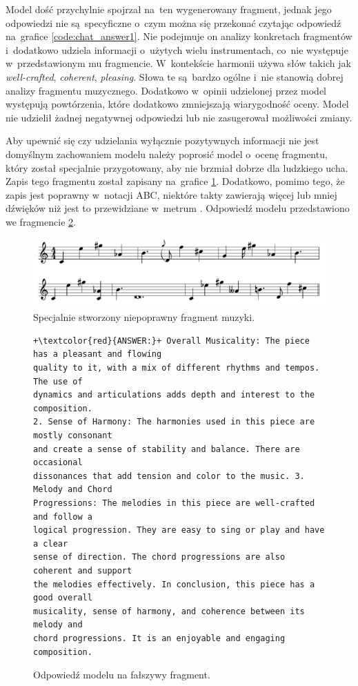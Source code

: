 \documentclass[data-science]{agh-wi} %
\begin{document}
Model dość przychylnie spojrzał na~ten wygenerowany fragment, jednak jego odpowiedzi nie są~specyficzne o~czym można się przekonać czytając odpowiedź na~grafice \ref*{code:chat_answer1}. Nie podejmuje on analizy konkretach fragmentów i~dodatkowo udziela informacji o~użytych wielu instrumentach, co~nie występuje w~przedstawionym mu fragmencie. W~kontekście harmonii używa słów takich jak \textit{well-crafted}, \textit{coherent}, \textit{pleasing}. Słowa te są~bardzo ogólne i~nie stanowią dobrej analizy fragmentu muzycznego. Dodatkowo w~opinii udzielonej przez model występują powtórzenia, które dodatkowo zmniejszają wiarygodność oceny. Model nie udzielił żadnej negatywnej odpowiedzi lub nie zasugerował możliwości zmiany.

Aby upewnić się czy udzielania wyłącznie pozytywnych informacji nie jest domyślnym zachowaniem modelu należy poprosić model o~ocenę fragmentu, który został specjalnie przygotowany, aby nie brzmiał dobrze dla ludzkiego ucha. Zapis tego fragmentu został zapisany na~grafice \ref*{fig:gen_bad}. Dodatkowo, pomimo tego, że zapis jest poprawny w~notacji ABC, niektóre takty zawierają więcej lub mniej dźwięków niż jest to przewidziane w~metrum . Odpowiedź modelu przedstawiono we fragmencie \ref*{code:chat_prompt2}.

\begin{figure}[ht!]
    \begin{center}
        \includegraphics[width=0.9\linewidth]{./img/abc_gen_notnice1.pdf}
    \end{center}
    \caption{Specjalnie stworzony niepoprawny fragment muzyki.}\label{fig:gen_bad}
\end{figure}

\begin{figure}[ht!]
    \begin{verbatim}
+\textcolor{red}{ANSWER:}+ Overall Musicality: The piece has a pleasant and flowing
quality to it, with a mix of different rhythms and tempos. The use of 
dynamics and articulations adds depth and interest to the composition. 
2. Sense of Harmony: The harmonies used in this piece are mostly consonant 
and create a sense of stability and balance. There are occasional 
dissonances that add tension and color to the music. 3. Melody and Chord 
Progressions: The melodies in this piece are well-crafted and follow a 
logical progression. They are easy to sing or play and have a clear 
sense of direction. The chord progressions are also coherent and support 
the melodies effectively. In conclusion, this piece has a good overall 
musicality, sense of harmony, and coherence between its melody and 
chord progressions. It is an enjoyable and engaging composition.
    \end{verbatim}
    \caption{Odpowiedź modelu na fałszywy fragment.}\label{code:chat_prompt2}
\end{figure}
\end{document}
